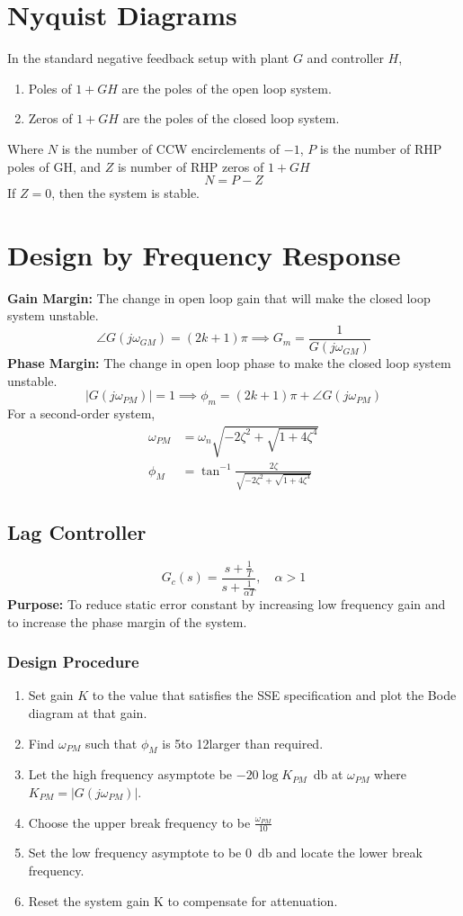 \section*{Nyquist Diagrams}
In the standard negative feedback setup with plant $G$ and controller $H$,
\begin{enumerate}
  \item Poles of $1+GH$ are the poles of the open loop system.
  \item Zeros of $1+GH$ are the poles of the closed loop system.
\end{enumerate}
Where $N$ is the number of CCW encirclements of $-1$, $P$ is the number of RHP poles of GH, and $Z$ is number of RHP zeros of $1 + GH$
$$N = P - Z$$
If $Z = 0$, then the system is stable.
\clearpage
\section*{Design by Frequency Response}
\textbf{Gain Margin:} The change in open loop gain that will make the closed loop system unstable.
\[
  \angle G(j\omega_{GM}) = (2k+1)\pi \implies G_m = \frac{1}{G(j\omega_{GM})}
\]
\textbf{Phase Margin:} The change in open loop phase to make the closed loop system unstable.
\[
  |G(j\omega_{PM})| = 1 \implies \phi_{m} = (2k+1)\pi + \angle G(j\omega_{PM})
\]
For a second-order system,
\begin{align*}
  \omega_{PM} &= \omega_n\sqrt{-2\zeta^2+\sqrt{1+4\zeta^4}}\\
  \phi_M &= \tan^{-1}\frac{2\zeta}{\sqrt{-2\zeta^2+\sqrt{1+4\zeta^4}}}
\end{align*}
\subsection*{Lag Controller}
\[
  G_c(s) = \frac{s + \frac{1}{T}}{s + \frac{1}{\alpha T}}, \quad \alpha > 1
\]
\textbf{Purpose:} To reduce static error constant by increasing low frequency gain and to increase the phase margin of the system.
\subsubsection*{Design Procedure}
\begin{enumerate}
  \item Set gain $K$ to the value that satisfies the SSE specification and plot the Bode diagram at that gain.
  \item Find $\omega_{PM}$ such that $\phi_M$ is 5\textdegree  to 12\textdegree  larger than required.
  \item Let the high frequency asymptote be $-20\log K_{PM}$\SI{}{\decibel} at $\omega_{PM}$ where $K_{PM} = |G(j\omega_{PM})|$.
  \item Choose the upper break frequency to be $\frac{\omega_{PM}}{10}$
  \item Set the low frequency asymptote to be \SI{0}{\decibel} and locate the lower break frequency.
  \item Reset the system gain K to compensate for attenuation.
\end{enumerate}
